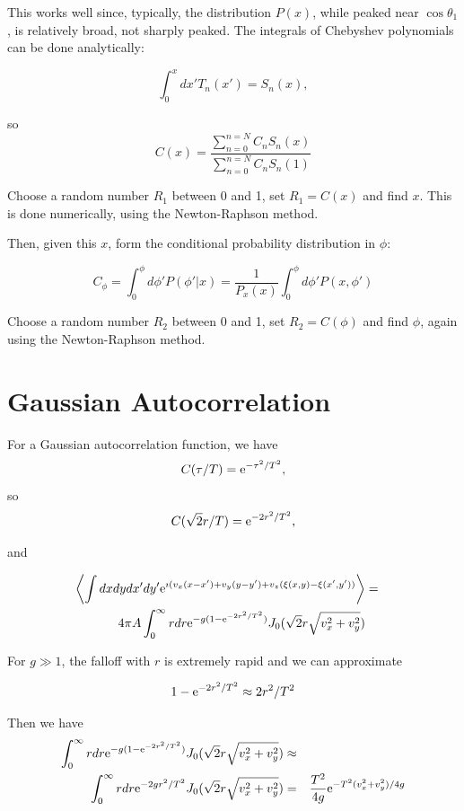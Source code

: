 \documentclass[11pt,openany]{report}
\newcommand{\e}{{\rm e}}
\begin{document}
{{This works well since, typically, the distribution $P(x)$, while
peaked near $\cos\theta_{1}$, is relatively broad, not sharply
peaked. The integrals of Chebyshev polynomials can be done
analytically:

$$\int_{0}^{x}dx'T_{n}(x')=S_{n}(x),$$

so
$$C(x)=\frac{\sum_{n=0}^{n=N}C_{n}S_{n}(x)}{\sum_{n=0}^{n=N}C_{n}S_{n}(1)}$$

Choose a random number $R_{1}$ between 0 and 1, set $R_{1}=C(x)$ and
find $x$.  This is done numerically, using the Newton-Raphson method.

Then, given this $x$, form the conditional probability distribution in $\phi$:

$$C_{\phi}=\int_{0}^{\phi}d\phi'P(\phi'|x)=\frac{1}{P_x(x)}\int_{0}^{\phi}d\phi'P(x,\phi')$$

Choose a random number $R_{2}$ between 0 and 1, set $R_{2}=C(\phi)$
and find $\phi$, again using the Newton-Raphson method.


\section{Gaussian Autocorrelation}

 For a Gaussian autocorrelation function, we have
 $$C(\tau/T)=\e^{-\tau^{2}/T^{2}},$$
 so
 $$C(\sqrt{2}r/T)=\e^{-2r^{2}/T^{2}},$$

 and
 
 \begin{eqnarray}
\left<\int dx dydx'dy'\e^{\imath( v_{x}(x-x')+v_{y}(y-y')+v_{z}(\xi(x,y)-\xi(x',y'))}\right>&=&\\
4\pi A\int_{0}^{\infty} r dr\e^{-g(1-\e^{-2r^{2}/T^{2}})} J_{0}(\sqrt{2}r\sqrt{v_{x}^{2}+v_{y}^{2}})\end{eqnarray}
 
For $g\gg 1$, the falloff with $r$ is extremely rapid and we can approximate

$$1-\e^{-2r^{2}/T^{2}}\approx 2r^{2}/T^{2}$$

Then we have
\begin{eqnarray}
\int_{0}^{\infty} r dr\e^{-g(1-\e^{-2r^{2}/T^{2}})} J_{0}(\sqrt{2}r\sqrt{v_{x}^{2}+v_{y}^{2}})&\approx&\\
\int_{0}^{\infty} r dr\e^{-2gr^{2}/T^{2}} J_{0}(\sqrt{2}r\sqrt{v_{x}^{2}+v_{y}^{2}})&=&
\frac{T^{2}}{4g}\e^{-T^{2}(v_{x}^{2}+v_{y}^{2})/4g}
\end{eqnarray}

}}
\end{document}
